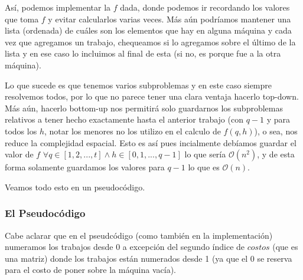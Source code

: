 \documentclass[A4paper,oneside,fleqn,11pt]{article}
\theoremstyle{definition}
\begin{document}
Así, podemos implementar la $f$ dada, donde podemos ir recordando los valores que toma $f$ y evitar calcularlos varias veces. Más aún podríamos mantener una lista (ordenada) de cuáles son los elementos que hay en alguna máquina y cada vez que agregamos un trabajo, chequeamos si lo agregamos sobre el último de la lista y en ese caso lo incluimos al final de esta (si no, es porque fue a la otra máquina).

Lo que sucede es que tenemos varios subproblemas y en este caso siempre resolvemos todos, por lo que no parece tener una clara ventaja hacerlo top-down. Más aún, hacerlo bottom-up nos permitirá solo guardarnos los subproblemas relativos a tener hecho exactamente hasta el anterior trabajo (con $q-1$ y para todos los $h$, notar los menores no los utilizo en el calculo de $f(q,h)$), o sea, nos reduce la complejidad espacial. Esto es así pues incialmente debíamos guardar el valor de $f$ $\forall q \in [1,2,...,t] \land h \in [0,1,...,q-1]$ lo que sería $\mathcal{O}(n^2)$, y de esta forma solamente guardamos los valores para $q-1$ lo que es $\mathcal{O}(n)$.

 Veamos todo esto en un pseudocódigo.
\subsubsection{El Pseudocódigo}

Cabe aclarar que en el pseudcódigo (como también en la implementación) numeramos los trabajos desde 0 a excepción del segundo índice de $costos$ (que es una matriz) donde los trabajos están numerados desde 1 (ya que el 0 se reserva para el costo de poner sobre la máquina vacía).
\end{document}
